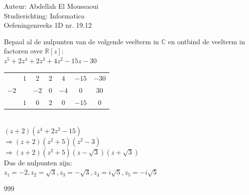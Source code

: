 \documentclass[a4paper]{article}
\begin{document}
  
\noindent \large Auteur: Abdellah El Moussaoui \\
\noindent \large Studierichting: Informatica\\
\noindent \large Oefeningenreeks 1D nr. 19.12\\

\medskip

\normalsize

Bepaal al de nulpunten van de volgende veelterm in $\mathbb{C}$ en ontbind de veelterm in factoren over $\mathbb{R}[z]$: \\

$z^5 + 2z^4 + 2z^3 + 4z^2 - 15z - 30$\\

\begin{tabular}{c|cccccc}
& $1$ & $2$ & $2$ & $4$ & $-15$ & $-30$\\
$-2$ & & $-2$ & $0$ & $-4$ & $0$ & $30$\\ \hline
& $1$ & $0$ & $2$ & $0$ & $-15$ & $0$
\end{tabular}\\

$(z+2)(z^4+2z^2-15)$\\

$\Rightarrow (z+2)(z^2+5)(z^2-3)$\\

$\Rightarrow (z+2)(z^2+5)(z-\sqrt{3})(z+\sqrt{3})$\\

Dus de nulpunten zijn:\\

$\boxed{z_1 = -2,z_2 = \sqrt{3},z_3 = -\sqrt{3},z_4 = i\sqrt{5},z_5 = -i\sqrt{5}}$\\


\begin{thebibliography}{999}
\end{thebibliography}
\end{document}
